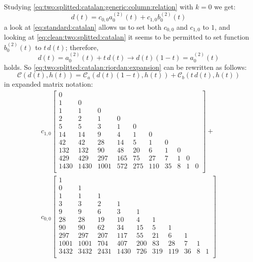 Studying \autoref{eq:two:splitted:catalan:generic:column:relation}
with $k=0$ we get:
\begin{equation} 
    d(t) = c_{0,0}a_{0}^{(2)}(t) + c_{1,0}b_{0}^{(2)}(t)
\end{equation} 
a look at \autoref{eq:standard:catalan} allows us to set both $c_{0,0}$ and $c_{1,0}$ to $1$,
and looking at \autoref{eq:clean:two:splitted:catalan} it seems to be permitted to set 
function $b_{0}^{(2)}(t)$ to $t\,d(t)$; therefore, 
\begin{equation} 
    d(t) = a_{0}^{(2)}(t) + t\,d(t) \rightarrow d(t)(1-t) = a_{0}^{(2)}(t)
\end{equation} 
holds. So \autoref{eq:two:splitted:catalan:riordan:expansion} can be rewritten as follows:
\begin{displaymath} 
    \mathcal{C}(d(t), h(t)) = \mathcal{C}_{a}(d(t)(1-t), h(t)) + \mathcal{C}_{b}(t\,d(t), h(t))
\end{displaymath} 
in expanded matrix notation:
\begin{displaymath}
\begin{array}{c}
c_{1,0}\left[\begin{matrix}
0 &  &  &  &  &  &  &  &  &  \\
1 & 0 &  &  &  &  &  &  &  &  \\
1 & 1 & 0 &  &  &  &  &  &  &  \\
2 & 2 & 1 & 0 &  &  &  &  &  &  \\
5 & 5 & 3 & 1 & 0 &  &  &  &  &  \\
14 & 14 & 9 & 4 & 1 & 0 &  &  &  &  \\
42 & 42 & 28 & 14 & 5 & 1 & 0 &  &  &  \\
132 & 132 & 90 & 48 & 20 & 6 & 1 & 0 &  &  \\
429 & 429 & 297 & 165 & 75 & 27 & 7 & 1 & 0 &  \\
1430 & 1430 & 1001 & 572 & 275 & 110 & 35 & 8 & 1 & 0 \\
\end{matrix}\right] +\\ 
c_{0,0}\left[\begin{matrix}
1 &  &  &  &  &  &  &  &  &  \\
0 & 1 &  &  &  &  &  &  &  &  \\
1 & 1 & 1 &  &  &  &  &  &  &  \\
3 & 3 & 2 & 1 &  &  &  &  &  &  \\
9 & 9 & 6 & 3 & 1 &  &  &  &  &  \\
28 & 28 & 19 & 10 & 4 & 1 &  &  &  &  \\
90 & 90 & 62 & 34 & 15 & 5 & 1 &  &  &  \\
297 & 297 & 207 & 117 & 55 & 21 & 6 & 1 &  &  \\
1001 & 1001 & 704 & 407 & 200 & 83 & 28 & 7 & 1 &  \\
3432 & 3432 & 2431 & 1430 & 726 & 319 & 119 & 36 & 8 & 1 \\
\end{matrix}\right]
\label{eq:matrix:expansion:two:splitted:catalan}
\end{array}
\end{displaymath}


